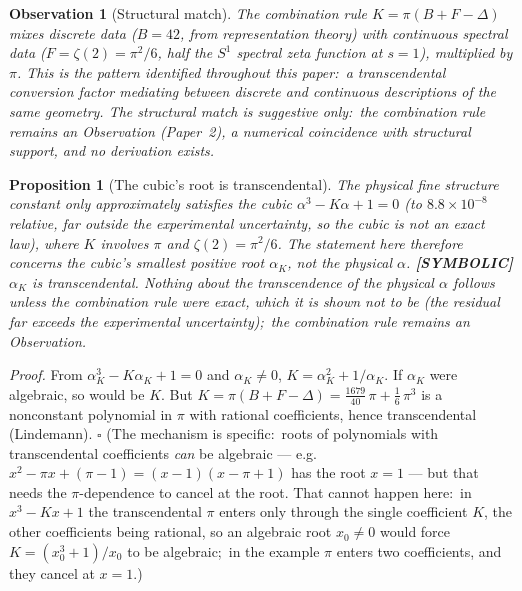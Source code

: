 \documentclass[aps,pra,twocolumn,superscriptaddress,longbibliography]{revtex4-2}
\newtheorem{observation}{Observation}
\newtheorem{proposition}{Proposition}
\begin{document}
\begin{observation}[Structural match]
The combination rule $K = \pi(B + F - \Delta)$ mixes discrete
data ($B = 42$, from representation theory) with continuous
spectral data ($F = \zeta(2) = \pi^2/6$, half the $S^1$
spectral zeta function at $s = 1$), multiplied by $\pi$.  This is
the pattern identified throughout this paper:\ a transcendental
conversion factor mediating between discrete and continuous
descriptions of the same geometry.
The structural match is suggestive only:\ the combination rule
remains an Observation (Paper~2), a numerical coincidence with
structural support, and no derivation exists.
\end{observation}

\begin{proposition}[The cubic's root is transcendental]
The physical fine structure constant only \emph{approximately}
satisfies the cubic $\alpha^3 - K\alpha + 1 = 0$ (to
$8.8\times10^{-8}$ relative, far outside the experimental
uncertainty, so the cubic is not an exact law), where $K$ involves
$\pi$ and $\zeta(2) = \pi^2/6$.  The statement here therefore
concerns the cubic's smallest positive root $\alpha_K$, not the
physical $\alpha$.  \textbf{[SYMBOLIC]} $\alpha_K$ is
transcendental.  Nothing about the transcendence of the physical
$\alpha$ follows unless the combination rule were exact, which it is
shown not to be (the residual far exceeds the experimental
uncertainty);\ the combination rule remains an Observation.
\end{proposition}
\emph{Proof.} From $\alpha_K^3 - K\alpha_K + 1 = 0$ and $\alpha_K\neq0$,
$K = \alpha_K^2 + 1/\alpha_K$. If $\alpha_K$ were algebraic, so would
be $K$. But $K = \pi(B+F-\Delta) = \tfrac{1679}{40}\,\pi +
\tfrac{1}{6}\,\pi^{3}$ is a nonconstant polynomial in $\pi$ with
rational coefficients, hence transcendental (Lindemann). $\square$
(The mechanism is specific:\ roots of polynomials with transcendental
coefficients \textit{can} be algebraic --- e.g.\ $x^2 - \pi x + (\pi-1)
= (x-1)(x-\pi+1)$ has the root $x = 1$ --- but that needs the
$\pi$-dependence to cancel at the root.  That cannot happen here:\ in
$x^3 - Kx + 1$ the transcendental $\pi$ enters only through the single
coefficient $K$, the other coefficients being rational, so an algebraic
root $x_0 \neq 0$ would force $K = (x_0^3 + 1)/x_0$ to be algebraic;\ in
the example $\pi$ enters two coefficients, and they cancel at $x = 1$.)
\end{document}
